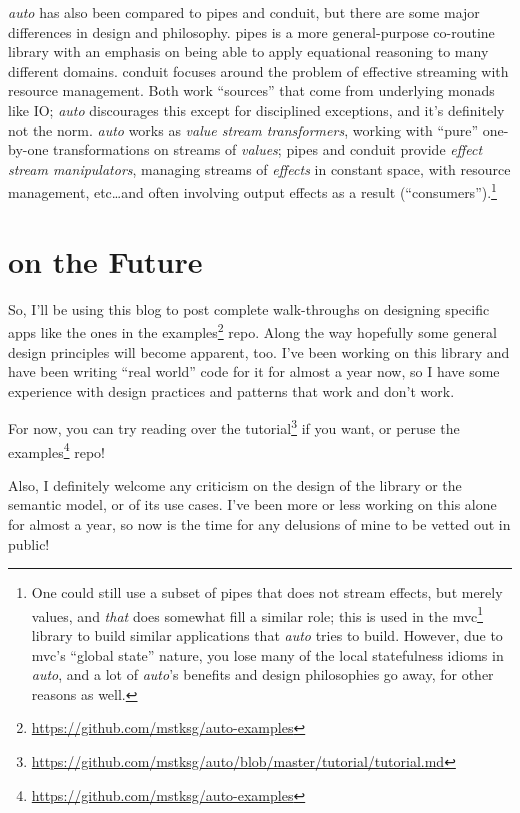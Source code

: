 \documentclass[]{article}
\renewcommand{\href}[2]{#2\footnote{\url{#1}}}
\begin{document}
\emph{auto} has also been compared to pipes and conduit, but there are
some major differences in design and philosophy. pipes is a more
general-purpose co-routine library with an emphasis on being able to
apply equational reasoning to many different domains. conduit focuses
around the problem of effective streaming with resource management. Both
work ``sources'' that come from underlying monads like IO; \emph{auto}
discourages this except for disciplined exceptions, and it's definitely
not the norm. \emph{auto} works as \emph{value stream transformers},
working with ``pure'' one-by-one transformations on streams of
\emph{values}; pipes and conduit provide \emph{effect stream
manipulators}, managing streams of \emph{effects} in constant space,
with resource management, etc\ldots{}and often involving output effects
as a result (``consumers'').\footnote{One could still use a subset of
  pipes that does not stream effects, but merely values, and \emph{that}
  does somewhat fill a similar role; this is used in the
  \href{https://hackage.haskell.org/package/mvc}{mvc} library to build
  similar applications that \emph{auto} tries to build. However, due to
  mvc's ``global state'' nature, you lose many of the local statefulness
  idioms in \emph{auto}, and a lot of \emph{auto}'s benefits and design
  philosophies go away, for other reasons as well.}

\section{on the Future}\label{on-the-future}

So, I'll be using this blog to post complete walk-throughs on designing
specific apps like the ones in the
\href{https://github.com/mstksg/auto-examples}{examples} repo. Along the
way hopefully some general design principles will become apparent, too.
I've been working on this library and have been writing ``real world''
code for it for almost a year now, so I have some experience with design
practices and patterns that work and don't work.

For now, you can try reading over the
\href{https://github.com/mstksg/auto/blob/master/tutorial/tutorial.md}{tutorial}
if you want, or peruse the
\href{https://github.com/mstksg/auto-examples}{examples} repo!

Also, I definitely welcome any criticism on the design of the library or
the semantic model, or of its use cases. I've been more or less working
on this alone for almost a year, so now is the time for any delusions of
mine to be vetted out in public!
\end{document}
